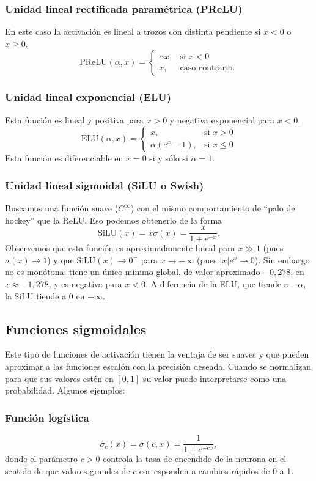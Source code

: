 \documentclass[12pt, a4paper]{amsbook}
\theoremstyle{remark}
\theoremstyle{definition}
\numberwithin{section}{chapter}
\numberwithin{subsection}{section}
\numberwithin{equation}{section}
\numberwithin{figure}{chapter}
\begin{document}
\subsubsection*{Unidad lineal rectificada paramétrica (PReLU)} En este caso la activación es lineal a trozos con distinta pendiente si $x<0$ o $x\ge 0$.
$$
\text{PReLU}(\alpha, x) = \begin{cases} \alpha x, &\text{si } x<0\\ x, & \text{caso contrario.}\end{cases}
$$

\subsubsection*{Unidad lineal exponencial (ELU)} Esta función es lineal y positiva para $x>0$ y negativa exponencial para $x<0$.
$$
\text{ELU}(\alpha, x) = \begin{cases}  x, &\text{si } x>0\\ \alpha(e^x-1), & \text{si } x\le 0\end{cases}
$$
Esta función es diferenciable en $x=0$ si y sólo si $\alpha=1$.

\subsubsection*{Unidad lineal sigmoidal (SiLU o Swish)} Buscamos una función suave ($C^\infty$) con el mismo comportamiento de ``palo de hockey'' que la ReLU. Eso podemos obtenerlo de la forma
$$
\text{SiLU}(x) = x\sigma(x) = \frac{x}{1+e^{-x}}. 
$$
Observemos que esta función es aproximadamente lineal para $x\gg 1$ (pues $\sigma(x)\to1$) y que $\text{SiLU}(x)\to0^-$ para $x\to-\infty$ (pues $|x|e^{x}\to0$). Sin embargo no es monótona: tiene un único mínimo global, de valor aproximado $-0{,}278$, en $x\approx-1{,}278$, y es negativa para $x<0$. A diferencia de la ELU, que tiende a $-\alpha$, la SiLU tiende a $0$ en $-\infty$.

\subsection*{Funciones sigmoidales} Este tipo de funciones de activación tienen la ventaja de ser suaves y que pueden aproximar a las funciones escalón con la precisión deseada. Cuando se normalizan para que sus valores estén en $[0,1]$ su valor puede interpretarse como una probabilidad. Algunos ejemplos:

\subsubsection*{Función logística}
$$
\sigma_c(x) = \sigma(c,x) = \frac{1}{1+e^{-cx}},
$$
donde el parámetro $c>0$ controla la tasa de encendido de la neurona en el sentido de que valores grandes de $c$ corresponden a cambios rápidos de 0 a 1.
\end{document}
